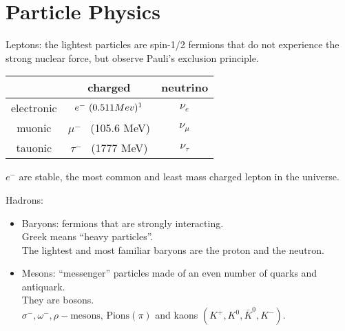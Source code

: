 \chapter{Particle Physics}

Leptons: the lightest particles are spin-1/2 fermions that do not experience the strong nuclear force, but observe Pauli's exclusion principle.

\begin{table}[ht] 
  \centering  
  \begin{tabular}{c c c} 
  \hline \hline  
     & charged & neutrino \\ 
  \hline 
    electronic & $e^{-}     ~(0.511 Mev) \footnotemark $ & $\nu_{e}$ \\
    muonic     & $\mu^{-}$  ~(105.6 MeV) & $\nu_{\mu}$ \\
    tauonic    & $\tau^{-}$ ~(1777 MeV) & $\nu_{\tau}$ \\
  \hline 
  \end{tabular} 
\end{table}

$e^{-}$ are stable, the most common and least mass charged lepton in the universe.

Hadrons: 
\begin{itemize}
   \item Baryons: fermions that are strongly interacting. \\
         Greek means ``heavy particles''. \\ 
         The lightest and most familiar baryons are the proton and the neutron.
   \item Mesons: ``messenger'' particles made of an even number of quarks and antiquark. \\
         They are bosons. \\
         $\sigma^{-},\omega^{-},\rho-\textrm{mesons, Pions}(\pi)$ and kaons $(K^{+},K^{0},\bar{K}^{0},K^{-})$.
\end{itemize}


